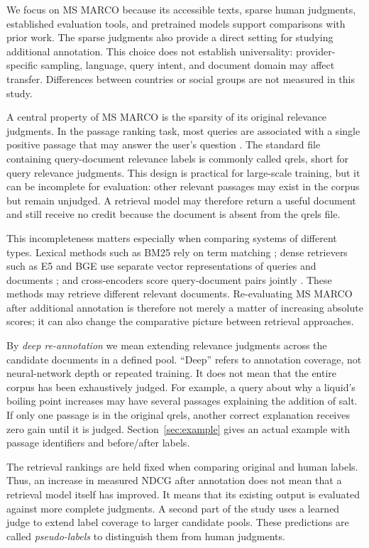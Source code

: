 \documentclass[runningheads,a4paper]{llncs}
\begin{document}
We focus on MS MARCO because its accessible texts, sparse human judgments, established evaluation tools, and pretrained models support comparisons with prior work. The sparse judgments also provide a direct setting for studying additional annotation. This choice does not establish universality: provider-specific sampling, language, query intent, and document domain may affect transfer. Differences between countries or social groups are not measured in this study.

A central property of MS MARCO is the sparsity of its original relevance judgments. In the passage ranking task, most queries are associated with a single positive passage that may answer the user's question \cite{msmarco_datasets}. The standard file containing query-document relevance labels is commonly called qrels, short for query relevance judgments. This design is practical for large-scale training, but it can be incomplete for evaluation: other relevant passages may exist in the corpus but remain unjudged. A retrieval model may therefore return a useful document and still receive no credit because the document is absent from the qrels file.

This incompleteness matters especially when comparing systems of different types. Lexical methods such as BM25 rely on term matching \cite{robertson2009bm25}; dense retrievers such as E5 and BGE use separate vector representations of queries and documents \cite{wang2022e5,xiao2023cpack}; and cross-encoders score query-document pairs jointly \cite{nogueira2019bert}. These methods may retrieve different relevant documents. Re-evaluating MS MARCO after additional annotation is therefore not merely a matter of increasing absolute scores; it can also change the comparative picture between retrieval approaches.

By \emph{deep re-annotation} we mean extending relevance judgments across the candidate documents in a defined pool. ``Deep'' refers to annotation coverage, not neural-network depth or repeated training. It does not mean that the entire corpus has been exhaustively judged. For example, a query about why a liquid's boiling point increases may have several passages explaining the addition of salt. If only one passage is in the original qrels, another correct explanation receives zero gain until it is judged. Section~\ref{sec:example} gives an actual example with passage identifiers and before/after labels.

The retrieval rankings are held fixed when comparing original and human labels. Thus, an increase in measured NDCG after annotation does not mean that a retrieval model itself has improved. It means that its existing output is evaluated against more complete judgments. A second part of the study uses a learned judge to extend label coverage to larger candidate pools. These predictions are called \emph{pseudo-labels} to distinguish them from human judgments.
\end{document}
